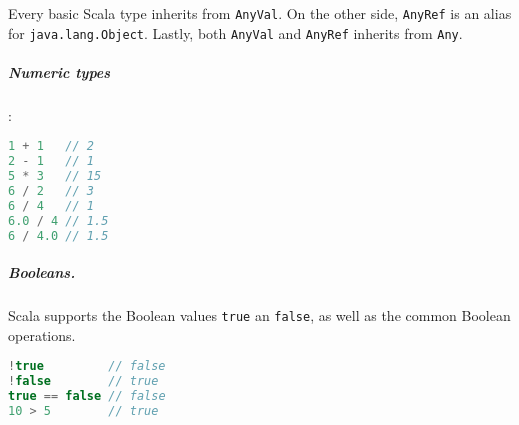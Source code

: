Every basic Scala type inherits from \texttt{AnyVal}. On the other side, \texttt{AnyRef} is an alias for \texttt{java.lang.Object}. Lastly, both \texttt{AnyVal} and \texttt{AnyRef} inherits from \texttt{Any}.

\subparagraph{Numeric types}:
\begin{lstlisting}[language=scala, style=snippet]
1 + 1   // 2
2 - 1   // 1
5 * 3   // 15
6 / 2   // 3
6 / 4   // 1
6.0 / 4 // 1.5
6 / 4.0 // 1.5
\end{lstlisting}

\subparagraph{Booleans.} Scala supports the Boolean values \texttt{true} an \texttt{false}, as well as the common Boolean operations.
\begin{lstlisting}[language=scala, style=snippet]
!true         // false
!false        // true
true == false // false
10 > 5        // true
\end{lstlisting}

